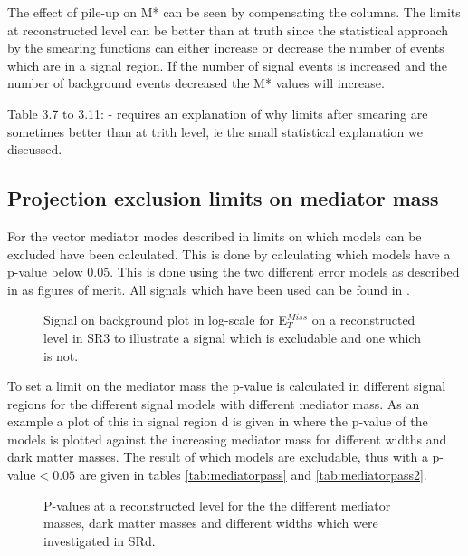 The effect of pile-up on M* can be seen by compensating the columns. The limits at reconstructed level can be better than at truth since the statistical approach by the smearing functions can either increase or decrease the number of events which are in a signal region. If the number of signal events is increased and the number of background events decreased the M* values will increase.


Table 3.7 to 3.11:
- requires an explanation of why limits after smearing are sometimes better than at trith level, ie the small statistical explanation we discussed.
 

\subsection{Projection exclusion limits on mediator mass}\label{sec:res:subsec:Mm}
For the vector mediator modes described in  limits on which models can be excluded have been calculated. This is done by calculating which models have a p-value below 0.05. This is done using the two different error models as described in  as figures of merit. All signals which have been used can be found in .


 \begin{figure}[H] %
    \hfill
    \caption{Signal on background plot in log-scale for E$^{Miss}_T$ on a reconstructed level in SR3 to illustrate a signal which is excludable and one which is not. }
    \label{fig:sigback}
  \end{figure}

To set a limit on the mediator mass the p-value is calculated in different signal regions for the different signal models with different mediator mass. As an example a plot of this in signal region d is given in  where the p-value of the models is plotted against the increasing mediator mass for different widths and dark matter masses. The result of which models are excludable, thus with a p-value$<0.05$ are given in tables \ref{tab:mediatorpass} and \ref{tab:mediatorpass2}.

 \begin{figure}[H] %
    \hfill
    \caption{P-values at a reconstructed level for the the different mediator masses, dark matter masses and different widths which were investigated in SRd.}
    \label{fig:modelex}
  \end{figure}




